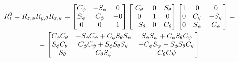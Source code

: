 \documentclass{article}
\begin{document}
\begin{itemize}
\begin{enumerate}
\begin{itemize}
    \begin{multline*}
    R^{0}_{1} = R_{z,\phi}R_{y,\theta}R_{x,\psi} =
    \begin{bmatrix}
    C_\phi & -S_\phi & 0 \\
    S_\phi & C_\phi & -0 \\
    0 & 0 & 1
    \end{bmatrix}
    \begin{bmatrix}
    C_\theta & 0 & S_\theta \\
    0 & 1 & 0 \\
    -S_\theta & 0 & C_\theta 
    \end{bmatrix}
    \begin{bmatrix}
    1 & 0 & 0 \\
    0& C_\psi & -S_\psi \\
    0 & S_\psi & C_\psi
    \end{bmatrix} =\\ =
    \linebreak
    \begin{bmatrix}
    C_\phi C_\theta & -S_\phi C_\psi + C_\phi S_\theta S_\psi & S_\phi S_\psi + C_\phi S_\theta C_\psi \\
    S_\phi C_\theta & C_\phi C_\psi + S_\phi S_\theta S_\psi & -C_\phi S_\psi + S_\phi S_\theta C_\psi \\
    -S_\theta & C_\theta S_\psi & C_\theta C\psi 
    \end{bmatrix}
 \end{multline*}
    \end{itemize}
    \end{enumerate}
\end{itemize}
\end{document}
